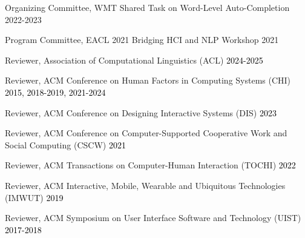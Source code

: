






\thispagestyle{secondstyle}









Organizing Committee, WMT Shared Task on Word-Level Auto-Completion \hfill 2022-2023

Program Committee, EACL 2021 Bridging HCI and NLP Workshop \hfill 2021

Reviewer, Association of Computational Linguistics (ACL) \hfill \textcolor{black}{2024-2025}

Reviewer, ACM Conference on Human Factors in Computing Systems (CHI) \hfill \textcolor{black}{2015, 2018-2019, 2021-2024}

Reviewer, ACM Conference on Designing Interactive Systems (DIS) \hfill \textcolor{black}{2023}

Reviewer, ACM Conference on Computer-Supported Cooperative Work and Social Computing (CSCW) \hfill \textcolor{black}{2021}

Reviewer, ACM Transactions on Computer-Human Interaction (TOCHI) \hfill \textcolor{black}{2022}

Reviewer, ACM Interactive, Mobile, Wearable and Ubiquitous Technologies (IMWUT) \hfill \textcolor{black}{2019}

Reviewer, ACM Symposium on User Interface Software and Technology (UIST) \hfill \textcolor{black}{2017-2018}\\




% 



% 


%
% 






%
%
%
%
%
%

